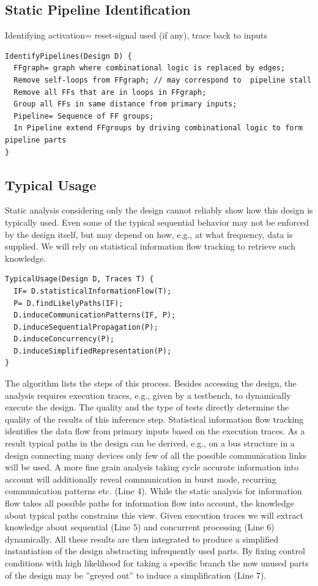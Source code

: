 \subsection{Static Pipeline Identification}

Identifying activation= reset-signal used (if any), trace back to inputs

\begin{verbatim}
IdentifyPipelines(Design D) {
  FFgraph= graph where combinational logic is replaced by edges;
  Remove self-loops from FFgraph; // may correspond to  pipeline stall
  Remove all FFs that are in loops in FFgraph;
  Group all FFs in same distance from primary inputs;
  Pipeline= Sequence of FF groups;
  In Pipeline extend FFgroups by driving combinational logic to form pipeline parts
}
\end{verbatim}

\subsection{Typical Usage }

Static analysis considering only the design cannot reliably show how this design is typically used. Even some of the typical sequential behavior may not be enforced by the design itself, but may depend on how, e.g., at what frequency, data is supplied. We will rely on statistical information flow tracking to retrieve such knowledge. 

\begin{verbatim}
TypicalUsage(Design D, Traces T) {
  IF= D.statisticalInformationFlow(T);
  P= D.findLikelyPaths(IF);
  D.induceCommunicationPatterns(IF, P);
  D.induceSequentialPropagation(P);
  D.induceConcurrency(P);
  D.induceSimplifiedRepresentation(P);
}
\end{verbatim}

The algorithm lists the steps of this process. Besides accessing the design, the analysis requires execution traces, e.g., given by a testbench, to dynamically execute the design. The quality and the type of tests directly determine the quality of the results of this inference step.
Statistical information flow tracking identifies the data flow from primary inputs based on the execution traces. As a result typical paths in the design can be derived, e.g., on a bus structure in a design connecting many devices only few of all the possible communication links will be used. A more fine grain analysis taking cycle accurate information into account will additionally reveal communication in burst mode, recurring communication patterns etc. (Line 4). While the static analysis for information flow takes all possible paths for information flow into account, the knowledge about typical paths constrains this view. Given execution traces we will extract knowledge about sequential (Line 5) and concurrent processing (Line 6) dynamically. All these results are then integrated to produce a simplified instantiation of the design abstracting infrequently used parts. By fixing control conditions with high likelihood for taking a specific branch the now unused parts of the design may be ''greyed out'' to induce a simplification (Line 7).

